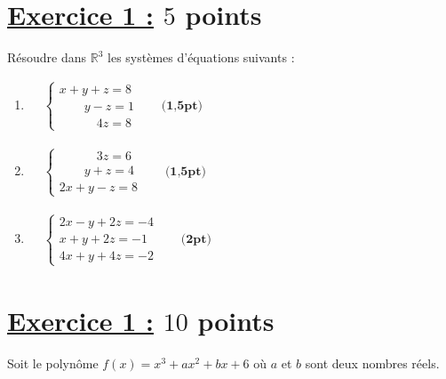 \documentclass[12pt,a4paper]{article}
\begin{document}
\section*{\underline{Exercice 1 :} $5$ points}

Résoudre dans \( \mathbb{R}^3 \) les systèmes d’équations suivants :
\begin{enumerate}
    \item \(
    \begin{aligned}
        &\begin{cases}
            x + y + z = 8 \\
            \quad\quad y - z = 1 \\
            \quad\quad\quad 4z = 8
        \end{cases} \quad &\textbf{(1,5pt)}
    \end{aligned}
    \)
    \item \(
    \begin{aligned}
        &\begin{cases}
            \quad\quad\quad 3z = 6 \\
            \quad\quad y + z = 4 \\
            2x + y - z = 8
        \end{cases} \quad &\textbf{(1,5pt)}
    \end{aligned}
    \)
    \item \(
    \begin{aligned}
        &\begin{cases}
            2x - y + 2z = -4 \\
            x + y + 2z = -1 \\
            4x + y + 4z = -2
        \end{cases} \quad &\textbf{(2pt)}
    \end{aligned}
    \)
\end{enumerate}


\section*{\underline{Exercice 1 :} $10$ points}
Soit le polynôme \( f(x) = x^3 + ax^2 + bx + 6 \) où \( a \) et \( b \) sont deux nombres réels.
\end{document}
